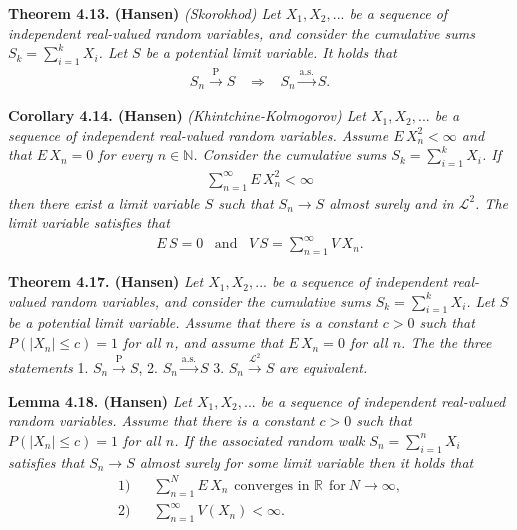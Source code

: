 \documentclass[a4paper,10pt,openany]{book}
\begin{document}
\textbf{Theorem 4.13. (Hansen)} \emph{(Skorokhod) Let \(X_1,X_2,...\) be a sequence of independent real-valued random variables, and consider the cumulative sums \(S_k=\sum_{i=1}^kX_i\). Let \(S\) be a potential limit variable. It holds that}
\begin{align*}
    S_n \stackrel{\text{P}}{\to} S\hspace{10pt}\Rightarrow\hspace{10pt} S_n\stackrel{\text{a.s.}}{\to} S.
\end{align*}

\textbf{Corollary 4.14. (Hansen)} \emph{(Khintchine-Kolmogorov) Let \(X_1,X_2,...\) be a sequence of independent real-valued random variables. Assume \(E\, X_n^2<\infty\) and that \(E\, X_n=0\) for every \(n\in\mathbb{N}\). Consider the cumulative sums \(S_k=\sum_{i=1}^kX_i\). If}
\begin{align*}
    \sum_{n=1}^\infty E\, X_n^2<\infty\tag{4.18}
\end{align*}
\emph{then there exist a limit variable \(S\) such that \(S_n\to S\) almost surely and in \(\mathcal{L}^2\). The limit variable satisfies that}
\begin{align*}
    E\, S=0\hspace{10pt}\text{and}\hspace{10pt}V\, S=\sum_{n=1}^\infty V\, X_n.
\end{align*}

\textbf{Theorem 4.17. (Hansen)} \emph{Let \(X_1,X_2,...\) be a sequence of independent real-valued random variables, and consider the cumulative sums \(S_k=\sum_{i=1}^kX_i\). Let \(S\) be a potential limit variable. Assume that there is a constant \(c>0\) such that \(P(\vert X_n\vert \le c)=1\) for all \(n\), and assume that \(E\, X_n=0\) for all \(n\). The the three statements}
1. \(S_n\stackrel{\text{P}}{\to} S\),
2. \(S_n\stackrel{\text{a.s.}}{\to} S\)
3. \(S_n\stackrel{\mathcal{L}^2}{\to} S\)
\emph{are equivalent.}

\textbf{Lemma 4.18. (Hansen)} \emph{Let \(X_1,X_2,...\) be a sequence of independent real-valued random variables. Assume that there is a constant \(c>0\) such that \(P(\vert X_n\vert \le c)=1\) for all \(n\). If the associated random walk \(S_n=\sum_{i=1}^n X_i\) satisfies that \(S_n\to S\) almost surely for some limit variable then it holds that}
\begin{align}
    \text{1)}\hspace{10pt}& \sum_{n=1}^NE\, X_n\hspace{5pt}\text{converges in }\mathbb{R}\hspace{5pt}\text{for}\ N\to \infty,\\
    \text{2)}\hspace{10pt}&\sum_{n=1}^\infty V(X_n)<\infty.
\end{align}
\end{document}
